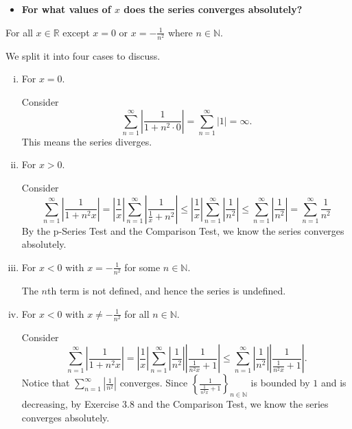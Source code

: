 \begin{Exercise}
	\begin{itemize}
		\item \textbf{For what values of $x$ does the series converges absolutely?}
	\end{itemize}
	\begin{answer}
		For all $x\in \mathbb{R}$ except $x=0$ or $x=-\frac{1}{n^2}$ where $n\in\mathbb{N}$.
	\end{answer}
	\begin{solution}
		We split it into four cases to discuss.
		\begin{enumerate}[i)]
			\item For $x=0$.
			
			Consider 
			$$
			\sum_{n=1}^{\infty} \left| \frac{1}{1 + n^2 \cdot 0} \right|
			= \sum_{n=1}^{\infty} \left| 1 \right| = \infty.
			$$
			This means the series diverges.
			
			\item For $x>0$.
			
			Consider
			$$
			\sum_{n=1}^{\infty} \left| \frac{1}{1 + n^2 x} \right|
			= \left| \frac{1}{x} \right| \sum_{n=1}^{\infty} \left| \frac{1}{\frac{1}{x} + n^2} \right| 
			\leq \left| \frac{1}{x} \right| \sum_{n=1}^{\infty} \left| \frac{1}{n^2} \right|
			\leq \sum_{n=1}^{\infty} \left| \frac{1}{n^2} \right|
			= \sum_{n=1}^{\infty} \frac{1}{n^2}
			$$
			By the p-Series Test and the Comparison Test, we know the series converges absolutely.
			
			\item For $x<0$ with $x = -\frac{1}{n^2}$ for some $n\in\mathbb{N}$.
			
			The $n$th term is not defined, and hence the series is undefined.
			
			\item For $x<0$ with $x \neq -\frac{1}{n^2}$ for all $n\in\mathbb{N}$.
			
			Consider 
			$$
			\sum_{n=1}^{\infty} \left| \frac{1}{1 + n^2 x} \right|
			= \left| \frac{1}{x} \right| \sum_{n=1}^{\infty} \left| \frac{1}{n^2} \right| \left| \frac{1}{\frac{1}{n^2 x} + 1} \right|
			\leq \sum_{n=1}^{\infty} \left| \frac{1}{n^2} \right| \left| \frac{1}{\frac{1}{n^2 x} + 1} \right|.
			$$
			Notice that $\sum_{n=1}^{\infty} \left| \frac{1}{n^2} \right|$ converges.
			Since $\left\{\frac{1}{\frac{1}{n^2 x} + 1} \right\}_{n\in\mathbb{N}}$ is bounded by $1$ and is decreasing, by Exercise 3.8 and the Comparison Test, we know the series converges absolutely.
		\end{enumerate}
	\end{solution}
	

\end{Exercise}

